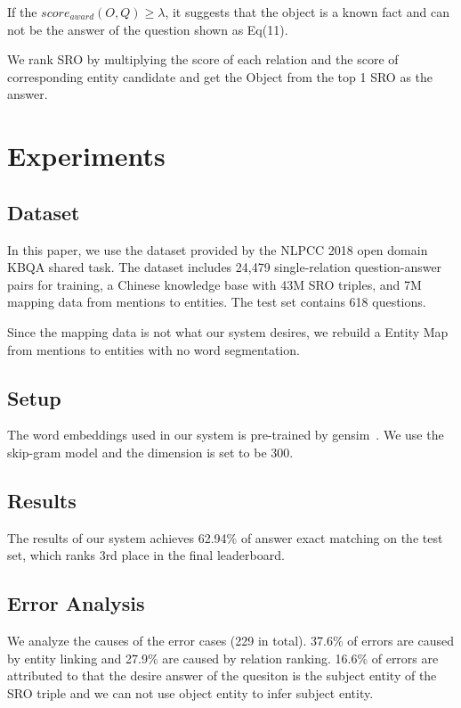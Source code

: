 \documentclass{llncs}
\begin{document}
If the $score_{award}(O, Q) \geq \lambda$, it suggests that 
the object is a known fact and can not be the answer of the question shown as Eq(11). 

We rank SRO by multiplying the score of each relation and the score 
of corresponding entity candidate and get the Object from the top 1 SRO as the answer.



\section{Experiments}

\subsection{Dataset}

In this paper, we use the dataset provided by the NLPCC 2018 open domain KBQA
shared task. The dataset includes 24,479 single-relation question-answer pairs for
training, a Chinese knowledge base with 43M SRO triples, and 7M mapping data from
mentions to entities. The test set contains 618 questions. 

Since the mapping data is not what our system desires, we rebuild a Entity Map 
from mentions to entities with no word segmentation.

\subsection{Setup}
The word embeddings used in our system is pre-trained by gensim\footnotemark\ . We use the 
skip-gram model \cite{Mikolov} and the dimension is set to be 300.

\subsection{Results}
The results of our system achieves 62.94\% of answer exact matching on the test 
set, which ranks 3rd place in the final leaderboard.

\subsection{Error Analysis}
We analyze the causes of the error cases (229 in total). 37.6\% of errors are 
caused by entity linking and 27.9\% are caused by relation ranking. 16.6\% of 
errors are attributed to that the desire answer of the quesiton is the subject 
entity of the SRO triple and we can not use object entity to infer subject entity. 
\end{document}
